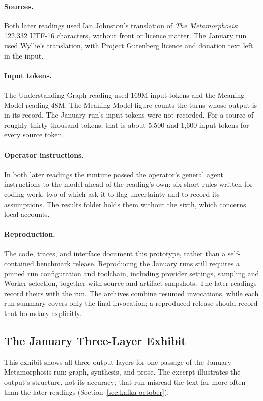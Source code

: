 \documentclass[11pt]{article}
\begin{document}
\paragraph{Sources.} Both later readings used Ian Johnston's translation of
\emph{The Metamorphosis}: 122,332 UTF-16 characters, without front or licence
matter. The January run used Wyllie's translation, with Project Gutenberg
licence and donation text left in the input.

\paragraph{Input tokens.} The Understanding Graph reading used 169M input
tokens and the Meaning Model reading 48M. The Meaning Model figure counts the
turns whose output is in its record. The January run's input tokens were not
recorded. For a source of roughly thirty thousand tokens, that is about
5,500 and 1,600 input tokens for every source token.

\paragraph{Operator instructions.} In both later readings the runtime passed
the operator's general agent instructions to the model ahead of the reading's
own: six short rules written for coding work, two of which ask it to flag
uncertainty and to record its assumptions. The results folder holds them
without the sixth, which concerns local accounts.

\paragraph{Reproduction.} The code, traces, and interface document this
prototype, rather than a self-contained benchmark release. Reproducing the
January runs still requires a pinned run configuration and toolchain,
including provider settings, sampling and Worker selection, together with
source and artifact snapshots. The later readings record theirs with the run.
The archives combine resumed invocations, while each run summary covers only
the final invocation; a reproduced release should record that boundary
explicitly.

\subsection{The January Three-Layer Exhibit}\label{app:january-exhibit}

This exhibit shows all three output layers for one
passage of the January Metamorphosis run: graph, synthesis, and prose. The
excerpt illustrates the output's structure, not its accuracy; that run misread
the text far more often than the later readings
(Section~\ref{sec:kafka-october}).
\end{document}
